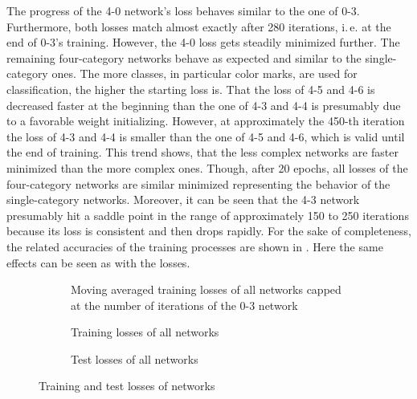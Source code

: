The progress of the 4-0 network's loss behaves similar to the one of 0-3.
Furthermore, both losses match almost exactly after 280 iterations, i.\,e. at the end of 0-3's training.
However, the 4-0 loss gets steadily minimized further.
The remaining four-category networks behave as expected and similar to the single-category ones.
The more classes, in particular color marks, are used for classification, the higher the starting loss is.
That the loss of 4-5 and 4-6 is decreased faster at the beginning than the one of 4-3 and 4-4 is presumably due to a favorable weight initializing.
However, at approximately the 450-th iteration the loss of 4-3 and 4-4 is smaller than the one of 4-5 and 4-6, which is valid until the end of training.
This trend shows, that the less complex networks are faster minimized than the more complex ones.
Though, after 20 epochs, all losses of the four-category networks are similar minimized representing the behavior of the single-category networks.
Moreover, it can be seen that the 4-3 network presumably hit a saddle point in the range of approximately 150 to 250 iterations because its loss is consistent and then drops rapidly.
For the sake of completeness, the related accuracies of the training processes are shown in .
Here the same effects can be seen as with the losses.
\begin{figure}
	\setlength{}
	\setlength{}
	\centering
	\begin{subfigure}{\textwidth}
		\centering
		
		\caption{Moving averaged training losses of all networks capped at the number of iterations of the 0-3 network}
		\label{fig:train-loss-iteration}
	\end{subfigure}
	\begin{subfigure}{\textwidth}
		\centering
		
		\caption{Training losses of all networks}
		\label{fig:train-loss}
	\end{subfigure}
	\begin{subfigure}{\textwidth}
		\centering
		
		\caption{Test losses of all networks}
		\label{fig:test-loss}
	\end{subfigure}
	\caption{Training and test losses of networks}
	\label{fig:networks-loss}
\end{figure}
